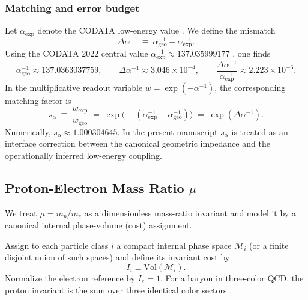 \subsubsection{Matching and error budget}
Let $\alpha_{\mathrm{exp}}$ denote the CODATA low-energy value \cite{CODATA2022RMP}. We define the mismatch
\begin{equation}
    \Delta\alpha^{-1}\ \equiv\ \alpha^{-1}_{\mathrm{geo}}-\alpha^{-1}_{\mathrm{exp}}.
    \label{eq:alpha_mismatch_def}
\end{equation}
Using the CODATA 2022 central value $\alpha_{\mathrm{exp}}^{-1}\approx 137.035999177$ \cite{CODATA2022RMP}, one finds
\begin{equation}
    \alpha_{\mathrm{geo}}^{-1}\approx 137.0363037759,\qquad
    \Delta\alpha^{-1}\approx 3.046\times 10^{-4},\qquad
    \frac{\Delta\alpha^{-1}}{\alpha_{\mathrm{exp}}^{-1}}\approx 2.223\times 10^{-6}.
\end{equation}
In the multiplicative readout variable $w=\exp(-\alpha^{-1})$, the corresponding matching factor is
\begin{equation}
    s_\alpha\ \equiv\ \frac{w_{\mathrm{exp}}}{w_{\mathrm{geo}}}
    \;=\;\exp\!\bigl(-(\alpha_{\mathrm{exp}}^{-1}-\alpha_{\mathrm{geo}}^{-1})\bigr)
    \;=\;\exp(\Delta\alpha^{-1}).
\end{equation}
Numerically, $s_\alpha\approx 1.000304645$. In the present manuscript $s_\alpha$ is treated as an interface correction between the canonical geometric impedance and the operationally inferred low-energy coupling.

\subsection{Proton-Electron Mass Ratio \texorpdfstring{$\mu$}{mu}}
We treat $\mu=m_p/m_e$ as a dimensionless mass-ratio invariant and model it by a canonical internal phase-volume (cost) assignment.

\begin{axiom}
\label{ax:mass_volume}
Assign to each particle class $i$ a compact internal phase space $\mathcal{M}_i$ (or a finite disjoint union of such spaces) and define its invariant cost by
\begin{equation}
    I_i \equiv \mathrm{Vol}(\mathcal{M}_i).
\end{equation}
Normalize the electron reference by $I_e=1$. For a baryon in three-color QCD, the proton invariant is the sum over three identical color sectors \cite{PDGRPP2024,PeskinSchroeder1995}.
\end{axiom}

